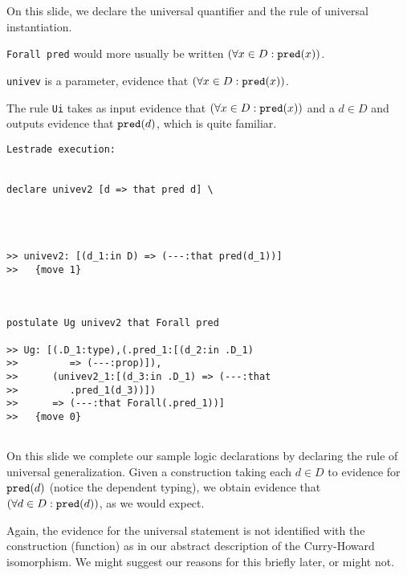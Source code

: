 \documentclass{slides}
\begin{document}
\begin{slide}

On this slide, we declare the universal quantifier and the rule of universal instantiation.

{\tt Forall pred} would more usually be written \newline $(\forall x \in D:{\tt pred}(x))$.

{\tt univev} is a parameter, evidence that \newline $(\forall x \in D:{\tt pred}(x))$.

The rule {\tt Ui} takes as input evidence that \newline $(\forall x \in D:{\tt pred}(x))$ and a $d \in D$ and outputs evidence that ${\tt pred}(d)$, which is quite familiar.


\end{slide}

\begin{slide}

\begin{verbatim}Lestrade execution:


declare univev2 [d => that pred d] \
   



>> univev2: [(d_1:in D) => (---:that pred(d_1))]
>>   {move 1}



postulate Ug univev2 that Forall pred

>> Ug: [(.D_1:type),(.pred_1:[(d_2:in .D_1)
>>         => (---:prop)]),
>>      (univev2_1:[(d_3:in .D_1) => (---:that
>>         .pred_1(d_3))])
>>      => (---:that Forall(.pred_1))]
>>   {move 0}


\end{verbatim}


\end{slide}

\begin{slide}

On this slide we complete our sample logic declarations by declaring the rule of universal generalization.  Given a construction taking each $d \in D$ to evidence for ${\tt pred}(d)$
(notice the dependent typing), we obtain evidence that $(\forall d \in D:{\tt pred}(d))$, as we would expect.

Again, the evidence for the universal statement is not identified with the construction (function) as in our abstract description of the Curry-Howard isomorphism.  We might suggest our reasons for this briefly later, or might not.

\end{slide}
\end{document}
